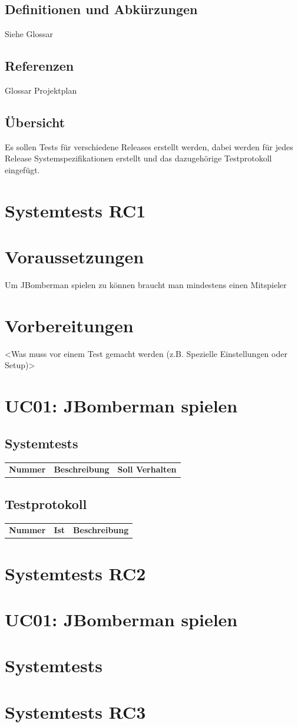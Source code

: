 \documentclass[11pt]{scrartcl}
\begin{document}
\subsection{Definitionen und Abkürzungen}
Siehe Glossar
\subsection{Referenzen}
Glossar
Projektplan
\subsection{Übersicht}
Es sollen Tests für verschiedene Releases erstellt werden, dabei werden für 
jedes Release Systemspezifikationen erstellt und das dazugehörige Testprotokoll 
eingefügt.
\section{Systemtests RC1}
\section{Voraussetzungen}
Um JBomberman spielen zu können braucht man mindestens einen Mitspieler
\section{Vorbereitungen}
<Was muss vor einem Test gemacht werden (z.B. Spezielle Einstellungen oder Setup)>
\section{UC01: JBomberman spielen}
\subsection{Systemtests}
\begin{tabularx}{\linewidth}{l X X}
  \bf{Nummer} & \bf{Beschreibung} & \bf{Soll Verhalten}
  
\end{tabularx}

\subsection{Testprotokoll}
\begin{tabularx}{\linewidth}{l X X}
  \bf{Nummer} & \bf{Ist} & \bf{Beschreibung}
  
\end{tabularx}

\section{Systemtests RC2}
\section{UC01: JBomberman spielen}
\section{Systemtests}
\section{Systemtests RC3}
\end{document}
